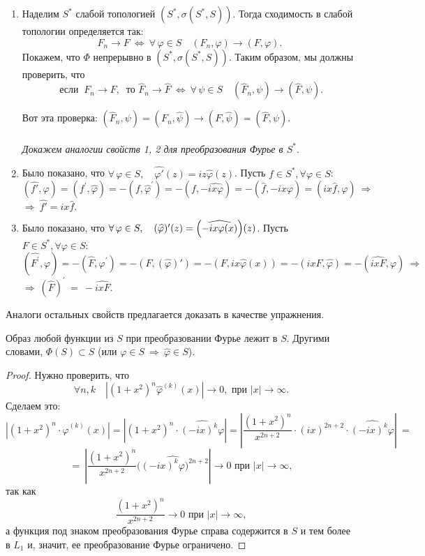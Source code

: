 \documentclass[a4paper]{article}
\newcommand{\ff} {\varphi}
\newcommand{\w}{\widehat}
\newcommand{\wphi}{\widehat{\varphi}}
\newcommand{\fw}{\widehat{f}}
\begin{document}
\begin{enumerate}
\item Наделим $S^*$ слабой топологией $(S^*, \sigma(S^*, S))$.
Тогда сходимость в слабой топологии определяется так:
$$
F_n \rightarrow F \ \Longleftrightarrow\  \forall\, \varphi \in
S\quad (F_n, \varphi) \rightarrow (F, \varphi).$$ Покажем, что
$\Phi$ непрерывно в $(S^{*}, \sigma(S^{*}, S)).$ Таким образом, мы
должны проверить, что
$$
\mbox{ если }\ F_n \rightarrow F,\ \mbox{ то } \w{F}_n \rightarrow
\w{F} \ \Longleftrightarrow\  \forall \,\psi \in S \quad (\w{F}_n,
\psi) \rightarrow (\widehat{F}, \psi).
$$

Вот эта проверка: $(\widehat{F}_n, \psi) = (F_n, \widehat{\psi})
\rightarrow (F, \widehat{\psi}) = (\widehat{F}, \psi)$.\\
\\
\emph{Докажем аналогии свойств 1, 2 для преобразования Фурье в $S^{*}.$}\\

\item Было показано, что $\forall \, \ff\in S, \quad  \w{\ff'}(z)
= iz \wphi (z)$. Пусть $f \in S^*, \forall \varphi \in S$:
$$
(\w{f'}, \ff) = (f^{\prime}, \w{\ff}) = - (f,
\w{\varphi}^{\prime}) = - (f, - \w{ix \ff}) = - (\fw, -ix\ff) =
(ix \fw, \ff)\ \Rightarrow
$$
$\Rightarrow\  \w{f'} = ix \fw.$\\

\item Было показано, что $\forall \, \ff\in S, \quad
(\w{\varphi})^{\prime}(z) = \Bigl(\w{-ix \varphi(x)}\Bigr)(z)$.
Пусть $F \in S^*, \forall \varphi \in S:$
$$
(\w{F^{\prime}}, \ff) = - (\w{F}, \ff^{\prime}) = - (F, (\wphi)')
= - (F, ix \wphi (x)) = - (ixF, \wphi) = - ( \w{ixF}, \ff) \
\Rightarrow
$$
$\Rightarrow\  (\w{F})^{\prime} \ =\ - \w{ixF}. $
\end{enumerate}

Аналоги остальных свойств предлагается доказать в качестве
упражнения.

\begin{stm}
Образ любой функции из $S$ при преобразовании Фурье лежит в $S$.
Другими словами, $\Phi(S) \subset S$ (или $\varphi \in S\
\Rightarrow\  \wphi \in S$).
\end{stm}
\begin{proof}
Нужно проверить, что
$$\forall n,k \quad |(1+x^2)^n \wphi^{(k)}(x)|
\rightarrow 0, \mbox{ при } |x| \rightarrow \infty.
$$
Сделаем это:
$$
\left|(1+x^2)^n \cdot\wphi^{(k)}(x)\right| = \left| (1+ x^2)^n
\cdot \w{(-ix)^k \varphi}\right| = \left| \frac{(1+
x^2)^n}{x^{2n+2}} \cdot (ix)^{2n+2} \cdot \widehat{(-ix)^k
\varphi}\right|\  =
$$
$$
= \ \left|\frac{(1+x^2)^n}{x^{2n+2}} \w{\bigl( (-ix)^k
\varphi\bigr)^{2n+2}}\right| \rightarrow 0 \text{ при } |x|
\rightarrow \infty,
$$
так как
$$
\frac{(1+x^2)^n}{x^{2n+2}} \rightarrow 0 \text{ при } |x|
\rightarrow \infty,
$$
а функция под знаком преобразования Фурье справа содержится в $S$
и тем более в $L_1$ и, значит, ее преобразование Фурье ограничено.

\end{proof}
\end{document}
